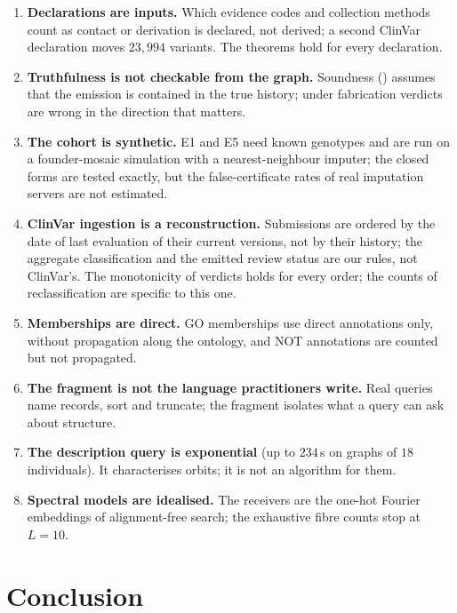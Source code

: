 \documentclass[11pt,twocolumn,a4paper]{article}
\theoremstyle{plain}
\theoremstyle{definition}
\theoremstyle{remark}
\begin{document}
\begin{enumerate}[label=\textbf{L\arabic*.},leftmargin=2.2em]
\item \textbf{Declarations are inputs.} Which evidence codes and collection
  methods count as contact or derivation is declared, not derived; a second
  ClinVar declaration moves $23{,}994$ variants. The theorems hold for every
  declaration.
\item \textbf{Truthfulness is not checkable from the graph.} Soundness
  () assumes that the emission is contained in the true
  history; under fabrication verdicts are wrong in the direction that matters.
\item \textbf{The cohort is synthetic.} E1 and E5 need known genotypes and are
  run on a founder-mosaic simulation with a nearest-neighbour imputer; the
  closed forms are tested exactly, but the false-certificate rates of real
  imputation servers \citep{das2016,browning2016} are not estimated.
\item \textbf{ClinVar ingestion is a reconstruction.} Submissions are ordered by
  the date of last evaluation of their current versions, not by their history;
  the aggregate classification and the emitted review status are our rules, not
  ClinVar's. The monotonicity of verdicts holds for every order; the counts of
  reclassification are specific to this one.
\item \textbf{Memberships are direct.} GO memberships use direct annotations
  only, without propagation along the ontology, and NOT annotations are counted
  but not propagated.
\item \textbf{The fragment is not the language practitioners write.} Real
  queries name records, sort and truncate; the fragment isolates what a query
  can ask about structure.
\item \textbf{The description query is exponential} (up to $234$\,s on graphs
  of $18$ individuals). It characterises orbits; it is not an algorithm for them.
\item \textbf{Spectral models are idealised.} The receivers are the one-hot
  Fourier embeddings of alignment-free search; the exhaustive fibre counts stop
  at $L=10$.
\end{enumerate}

\section{Conclusion}
\label{sec:conclusion}
\end{document}
